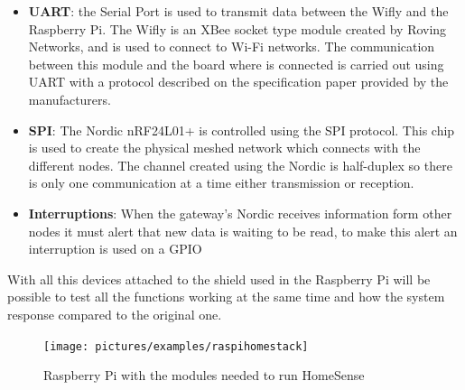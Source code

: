 \begin{itemize}
\item \textbf{UART}: the Serial Port is used to transmit data between the Wifly and the Raspberry Pi. The Wifly is an XBee socket type module created by Roving Networks, and is used to connect to Wi-Fi networks. The communication between this module and the board where is connected is carried out using UART with a protocol described on the specification paper provided by the manufacturers.

\item \textbf{SPI}: The Nordic nRF24L01+ is controlled using the SPI protocol. This chip is used to create the physical meshed network which connects with the different nodes. The channel created using the Nordic is half-duplex so there is only one communication at a time either transmission or reception.
\item \textbf{Interruptions}: When the gateway's Nordic receives information form other nodes it must alert that new data is waiting to be read, to make this alert an interruption is used on a GPIO
\end{itemize}
With all this devices attached to the shield used in the Raspberry Pi will be possible to test all the functions working at the same time and how the system response compared to the original one.
\begin{figure}[H]\begin{center}
 \centering
  \captionsetup{justification=centering}
  \texttt{[image: pictures/examples/raspihomestack]}
  \caption{Raspberry Pi with the modules needed to run HomeSense\label{fig:IOEx-HS-Stack}}
\end{center}\end{figure}

